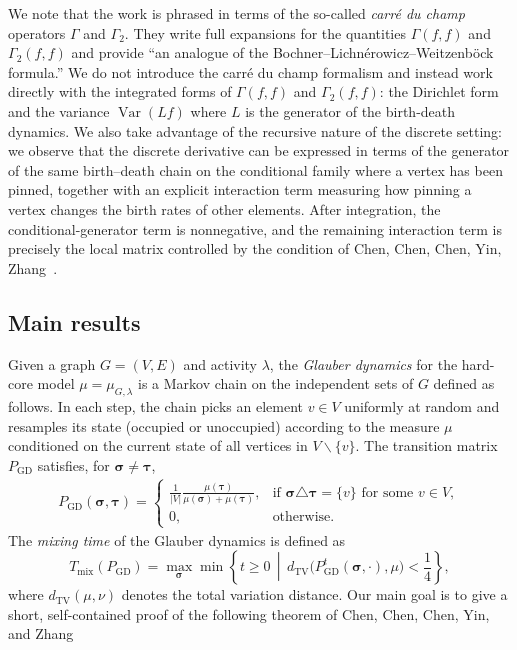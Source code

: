 \documentclass[10pt,a4paper]{amsart}
\newcommand{\Var}{{\operatorname{Var}}}
\newcommand{\sigmabf}{ \boldsymbol{\sigma} }
\newcommand{\taubf}{ \boldsymbol{\tau} }
\begin{document}
	We note that the work \cite{kondratiev2013spectral} is phrased in terms of the so-called \emph{carr\'e du champ} operators $\Gamma$ and $\Gamma_2$.  They write full expansions for the quantities $\Gamma(f,f)$ and $\Gamma_2(f,f)$ and provide ``an analogue of the Bochner--Lichn\'erowicz--Weitzenb\"ock formula.'' 
	We do not introduce the carr\'{e} du champ formalism and instead work directly with the integrated forms of $\Gamma(f,f)$ and $\Gamma_2(f,f)$: the
	Dirichlet form and the variance $\Var(Lf)$ where $L$ is the generator of the birth-death dynamics. 
	We also take advantage of the recursive nature of the discrete setting: we observe that the discrete derivative can be expressed in terms of the generator of the same birth--death chain on the conditional family where a vertex has been pinned, together with an explicit interaction term measuring how pinning a vertex changes the birth rates of other elements. After integration, the conditional-generator term is nonnegative, and the remaining interaction term is precisely the local matrix controlled by the condition of Chen, Chen, Chen, Yin, Zhang~\cite{chen2025rapid}.
	
	
	
	\subsection*{Main results}
	
	
	
	
	Given a graph $G=(V,E)$ and activity $\lambda$, the \emph{Glauber dynamics} for the hard-core model $\mu=\mu_{G,\lambda}$ is a Markov chain on the independent sets of $G$ defined as follows. In each 
	step, the chain picks an element $v\in V$ uniformly at random and resamples its state (occupied or unoccupied) according to the measure $\mu$ conditioned on the current state of all vertices in $V\backslash\{v\}$.
	The transition matrix $P_{\mathrm{GD}}$ satisfies, for
	$\sigmabf\neq \taubf$,
	\begin{align}\label{eq:Glauber}
		P_{\mathrm{GD}}(\sigmabf,\taubf)
		=
		\begin{cases}
			\displaystyle
			\frac{1}{|V|}\frac{\mu(\taubf)}{\mu(\sigmabf)+\mu(\taubf)},
			&\text{if }\sigmabf\triangle \taubf=\{v\}\text{ for some }v\in V,\\[3mm]
			0,
			&\text{otherwise.}
		\end{cases}
	\end{align}
	The \emph{mixing time} of the Glauber dynamics is defined as
	\[
	T_{\mathrm{mix}}(P_{\mathrm{GD}})
	=
	\max_{\sigmabf}
	\min\left\{
	t\ge 0 \,\middle|\,
	d_{\mathrm{TV}}\bigl(P_{\mathrm{GD}}^t(\sigmabf,\cdot),\mu\bigr)<\frac14
	\right\},
	\]
	where
	\(
	d_{\mathrm{TV}}(\mu,\nu)
	\)
	denotes the total variation distance.
	Our main goal is to give a short, self-contained proof of the following theorem of Chen, Chen, Chen, Yin, and Zhang~\cite[Theorem 1.2]{chen2025rapid}
	
\end{document}
